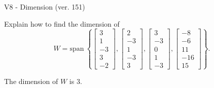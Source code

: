\begin{exercise}
  \begin{exerciseTitle}V8 - Dimension (ver. 151)\end{exerciseTitle}
  \begin{exerciseStatement}
    Explain how to find the dimension of 
\[W=\mathrm{span}\ \left\{\left[\begin{array}{r}
3 \\
1 \\
-3 \\
3 \\
-2
\end{array}\right] , \left[\begin{array}{r}
2 \\
-3 \\
1 \\
-3 \\
3
\end{array}\right] , \left[\begin{array}{r}
3 \\
-3 \\
0 \\
1 \\
-3
\end{array}\right] , \left[\begin{array}{r}
-8 \\
-6 \\
11 \\
-16 \\
15
\end{array}\right]\right\}.\]



  \end{exerciseStatement}
  \begin{exerciseAnswer}
   The dimension of \(W\) is  \(3\).
  


  \end{exerciseAnswer}
\end{exercise}